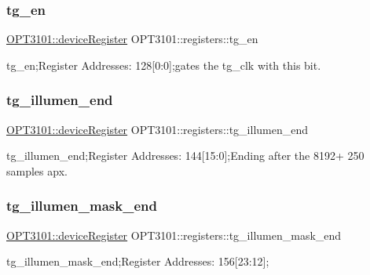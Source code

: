 \subsubsection{\texorpdfstring{tg\+\_\+en}{tg\_en}}
{\footnotesize\ttfamily \mbox{\hyperlink{class_o_p_t3101_1_1device_register}{O\+P\+T3101\+::device\+Register}} O\+P\+T3101\+::registers\+::tg\+\_\+en}



tg\+\_\+en;Register Addresses\+: 128\mbox{[}0\+:0\mbox{]};gates the tg\+\_\+clk with this bit. 

\mbox{\label{class_o_p_t3101_1_1registers_a70082ca9b2affbe66ae355c3f66df5cb}} 
\subsubsection{\texorpdfstring{tg\+\_\+illumen\+\_\+end}{tg\_illumen\_end}}
{\footnotesize\ttfamily \mbox{\hyperlink{class_o_p_t3101_1_1device_register}{O\+P\+T3101\+::device\+Register}} O\+P\+T3101\+::registers\+::tg\+\_\+illumen\+\_\+end}



tg\+\_\+illumen\+\_\+end;Register Addresses\+: 144\mbox{[}15\+:0\mbox{]};Ending after the 8192+ 250 samples apx. 

\mbox{\label{class_o_p_t3101_1_1registers_af45af1b39e7f8d73bece88e66f68de06}} 
\subsubsection{\texorpdfstring{tg\+\_\+illumen\+\_\+mask\+\_\+end}{tg\_illumen\_mask\_end}}
{\footnotesize\ttfamily \mbox{\hyperlink{class_o_p_t3101_1_1device_register}{O\+P\+T3101\+::device\+Register}} O\+P\+T3101\+::registers\+::tg\+\_\+illumen\+\_\+mask\+\_\+end}



tg\+\_\+illumen\+\_\+mask\+\_\+end;Register Addresses\+: 156\mbox{[}23\+:12\mbox{]}; 

